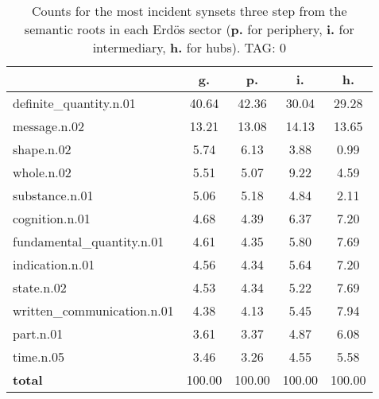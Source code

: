 \begin{table}[h!]
\begin{center}
\begin{tabular}{| l | c | c | c | c |}\hline
 & g. & p. & i. & h. \\\hline
definite\_quantity.n.01 & 40.64  & 42.36  & 30.04  & 29.28 \\\hline
message.n.02 & 13.21  & 13.08  & 14.13  & 13.65 \\\hline
shape.n.02 & 5.74  & 6.13  & 3.88  & 0.99 \\\hline
whole.n.02 & 5.51  & 5.07  & 9.22  & 4.59 \\\hline
substance.n.01 & 5.06  & 5.18  & 4.84  & 2.11 \\\hline
cognition.n.01 & 4.68  & 4.39  & 6.37  & 7.20 \\\hline
fundamental\_quantity.n.01 & 4.61  & 4.35  & 5.80  & 7.69 \\\hline
indication.n.01 & 4.56  & 4.34  & 5.64  & 7.20 \\\hline
state.n.02 & 4.53  & 4.34  & 5.22  & 7.69 \\\hline
written\_communication.n.01 & 4.38  & 4.13  & 5.45  & 7.94 \\\hline
part.n.01 & 3.61  & 3.37  & 4.87  & 6.08 \\\hline
time.n.05 & 3.46  & 3.26  & 4.55  & 5.58 \\\hline
{{\bf total}} & 100.00  & 100.00  & 100.00  & 100.00 \\\hline
\end{tabular}
\caption{Counts for the most incident synsets three step from the semantic roots in each Erd\"os sector ({\bf p.} for periphery, {\bf i.} for intermediary, {\bf h.} for hubs). TAG: 0}
\end{center}
\end{table}